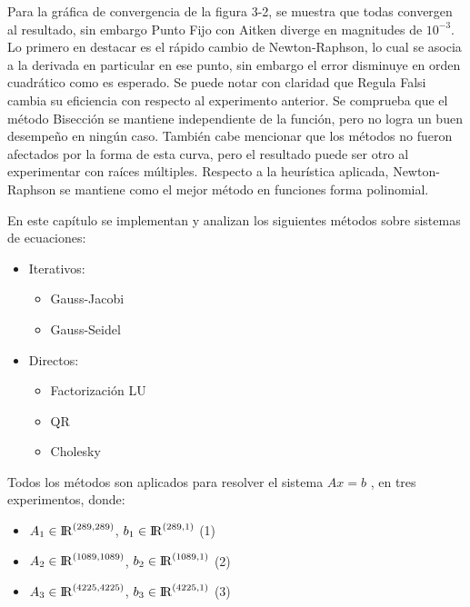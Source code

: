 \documentclass{memoria}
\begin{document}

Para la gráfica de convergencia de la figura 3-2, se muestra que todas convergen al resultado, sin embargo Punto Fijo con Aitken diverge en magnitudes de $10^{-3}$. Lo primero en destacar es el rápido cambio de Newton-Raphson, lo cual se asocia a la derivada en particular en ese punto, sin embargo el error disminuye en orden cuadrático como es esperado. Se puede notar con claridad que Regula Falsi cambia su eficiencia con respecto al experimento anterior.
Se comprueba que el método Bisección se mantiene independiente de la función, pero no logra un buen desempeño en ningún caso. También cabe mencionar que los métodos no fueron afectados por la forma de esta curva, pero el resultado puede ser otro al experimentar con raíces múltiples. 
Respecto a la heurística aplicada, Newton-Raphson se mantiene como el mejor método en funciones forma polinomial.


En este capítulo se implementan y analizan los siguientes métodos sobre sistemas de ecuaciones:

\begin{itemize}
    \item Iterativos:
    \begin{itemize}
        \item Gauss-Jacobi
        \item Gauss-Seidel
    \end{itemize}
    \item Directos:
    \begin{itemize}
        \item Factorización LU
        \item QR
        \item Cholesky
    \end{itemize}
\end{itemize}

Todos los métodos son aplicados para resolver el sistema $Ax = b$ , en tres experimentos, donde:
\begin{itemize}
    \item $A_{1} \in {\rm I\!R}^{(289, 289)}$, $b_{1} \in {\rm I\!R}^{(289, 1)} $ (1)
    \item $A_{2} \in {\rm I\!R}^{(1089, 1089)}$, $b_{2} \in {\rm I\!R}^{(1089, 1)} $ (2)
    \item $A_{3} \in {\rm I\!R}^{(4225, 4225)}$, $b_{3} \in {\rm I\!R}^{(4225, 1)}$ (3)
\end{itemize}
\end{document}
